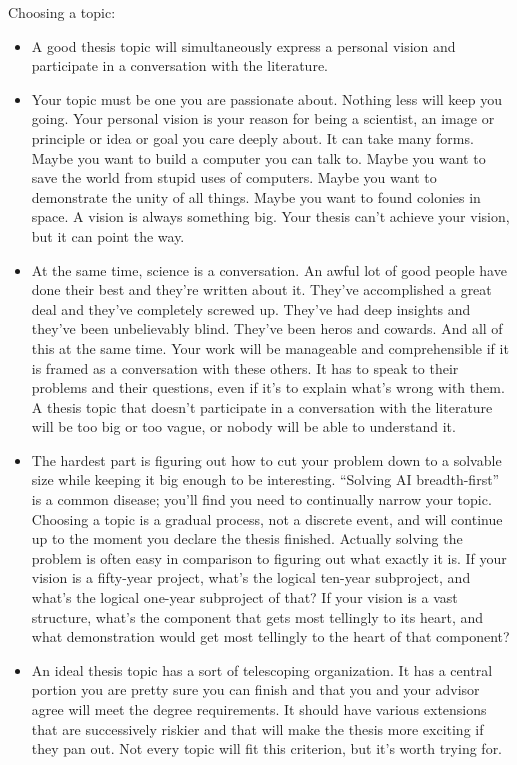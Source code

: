 Choosing a topic:
\begin{itemize}
\item A good thesis topic will simultaneously express a personal vision and participate in a conversation with the literature.
\item Your topic must be one you are passionate about. Nothing less will keep you going. Your personal vision is your reason for being a scientist, an image or principle or idea or goal you care deeply about. It can take many forms. Maybe you want to build a computer you can talk to. Maybe you want to save the world from stupid uses of computers. Maybe you want to demonstrate the unity of all things. Maybe you want to found colonies in space. A vision is always something big. Your thesis can’t achieve your vision, but it can point the way.
\item At the same time, science is a conversation. An awful lot of good people have done their best and they’re written about it. They’ve accomplished a great deal and they’ve completely screwed up. They’ve had deep insights and they’ve been unbelievably blind. They’ve been heros and cowards. And all of this at the same time. Your work will be manageable and comprehensible if it is framed as a conversation with these others. It has to speak to their problems and their questions, even if it’s to explain what’s wrong with them.  A thesis topic that doesn’t participate in a conversation with the literature will be too big or too vague, or nobody will be able to understand it.
\item The hardest part is figuring out how to cut your problem down to a solvable size while keeping it big enough to be interesting. “Solving AI breadth-first” is a common disease; you’ll find you need to continually narrow your topic.  Choosing a topic is a gradual process, not a discrete event, and will continue up to the moment you declare the thesis finished. Actually solving the problem is often easy in comparison to figuring out what exactly it is. If your vision is a fifty-year project, what’s the logical ten-year subproject, and what’s the logical one-year subproject of that? If your vision is a vast structure, what’s the component that gets most tellingly to its heart, and what demonstration would get most tellingly to the heart of that component?
\item An ideal thesis topic has a sort of telescoping organization. It has a central portion you are pretty sure you can finish and that you and your advisor agree will meet the degree requirements. It should have various extensions that are successively riskier and that will make the thesis more exciting if they pan out. Not every topic will fit this criterion, but it’s worth trying for.

\end{itemize}
